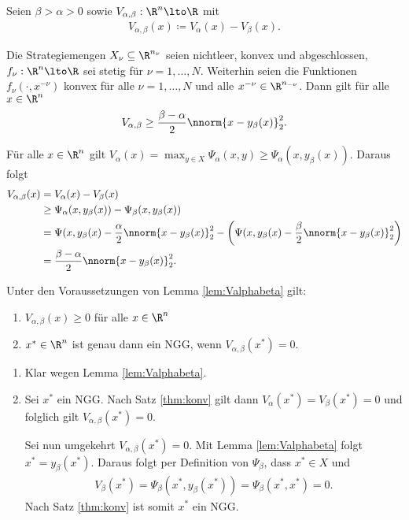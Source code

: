 Seien $\beta > \alpha > 0$ sowie $V_{\alpha, \beta}: \R^{n} \lto \R$ mit
\begin{align*}
  V_{\alpha, \beta}(x) \coloneqq V_{\alpha}(x) - V_{\beta}(x). 
\end{align*}
\begin{lemma}\label{lem:Valphabeta} %
  Die Strategiemengen $X_{\nu} \subseteq \R^{n_{\nu}}$ seien nichtleer, konvex und abgeschlossen, $f_{\nu}: \R^{n} \lto \R$ sei stetig für $\nu = 1, \dots, N$. Weiterhin seien die Funktionen $f_{\nu}(\cdot, x^{-\nu})$ konvex für alle $\nu = 1, \dots, N$ und alle $x^{-\nu} \in \R^{n_{-\nu}}$. Dann gilt für alle $ x\in \R^{n}$
  \begin{align*}
    V_{\alpha, \beta} \geq \frac {\beta - \alpha}{ 2} \nnorm{x - y_{\beta}(x)}_{2}^{2}. 
  \end{align*}
\end{lemma}
\begin{beweis}
  Für alle $ x \in \R^{n}$ gilt $V_{\alpha}(x) = \max_{y \in X}\Psi_{\alpha}(x, y) \geq \Psi_{\alpha} (x, y_{\beta}(x))$. Daraus folgt
  \begin{align*}
    V_{\alpha, \beta}(x) &= V_{\alpha}(x) - V_{\beta}(x)\\
& \geq \Psi_{\alpha}(x, y_{\beta}(x)) - \Psi_{\beta}(x, y_{\beta}(x)) \\
&= \Psi(x, y_{\beta}(x) - \frac \alpha 2 \nnorm{x - y_{\beta}(x)}_{2}^{2} - \left(\Psi(x, y_{\beta}(x) - \frac \beta2 \nnorm{x - y_{\beta}(x)}_{2}^{2}\right)\\
&= \frac{\beta - \alpha} 2 \nnorm {x - y_{\beta}(x)}_{2}^{2}. 
  \end{align*}
\end{beweis}
\begin{satz}%
  Unter den Voraussetzungen von Lemma \ref{lem:Valphabeta} gilt:
  \begin{enumerate}
  \item $V_{\alpha, \beta}(x) \geq 0$ für alle $x \in \R^{n}$
  \item $x^{*} \in \R^{n}$ ist genau dann ein NGG, wenn $V_{\alpha, \beta}(x^{*}) = 0$. 
  \end{enumerate}
\end{satz}
\begin{beweis}
  \begin{enumerate}
  \item Klar wegen Lemma \ref{lem:Valphabeta}. 
  \item Sei $x^{*}$ ein NGG. Nach Satz \ref{thm:konv} gilt dann $V_{\alpha}(x^{*}) = V_{\beta}(x^{*}) = 0$ und folglich gilt $V_{\alpha, \beta}(x^{*}) = 0$.

    Sei nun umgekehrt $V_{\alpha, \beta}(x^{*}) = 0$. Mit Lemma \ref{lem:Valphabeta} folgt $x^{*} = y_{\beta}(x^{*})$. Daraus folgt per Definition von $\Psi_{\beta}$, dass $x^{*} \in X$ und 
    \begin{align*}
      V_{\beta}(x^{*})  = \Psi_{\beta}(x^{*}, y_{\beta}(x^{*})) = \Psi_{\beta}(x^{*}, x^{*}) = 0. 
    \end{align*}
Nach Satz \ref{thm:konv} ist somit $x^{*}$ ein NGG. 
  \end{enumerate}
\end{beweis}

